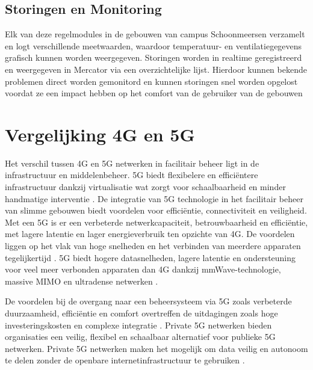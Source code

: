 \subsection{Storingen en Monitoring}
Elk van deze regelmodules in de gebouwen van campus Schoonmeersen verzamelt en logt verschillende meetwaarden, waardoor temperatuur- en ventilatiegegevens grafisch kunnen worden weergegeven.\newline\newline
Storingen worden in realtime geregistreerd en weergegeven in Mercator via een overzichtelijke lijst. Hierdoor kunnen bekende problemen direct worden gemonitord en kunnen storingen snel worden opgelost voordat ze een impact hebben op het comfort van de gebruiker van de gebouwen


\section{Vergelijking 4G en 5G}
Het verschil tussen 4G en 5G netwerken in facilitair beheer ligt in de infrastructuur en middelenbeheer. 5G biedt flexibelere en efficiëntere infrastructuur dankzij virtualisatie wat zorgt voor schaalbaarheid en minder handmatige interventie \autocite{degambur2021resource}. De integratie van 5G technologie in het facilitair beheer van slimme gebouwen biedt voordelen voor efficiëntie, connectiviteit en veiligheid. Met een 5G is er een verbeterde netwerkcapaciteit, betrouwbaarheid en efficiëntie, met lagere latentie en lager energieverbruik ten opzichte van 4G. De voordelen liggen op het vlak van hoge snelheden en het verbinden van meerdere apparaten tegelijkertijd \autocite{mihret20214g}. 5G biedt hogere datasnelheden, lagere latentie en ondersteuning voor veel meer verbonden apparaten dan 4G dankzij mmWave-technologie, massive MIMO en ultradense netwerken \autocite{Hui_2020}.

De voordelen bij de overgang naar een beheersysteem via 5G zoals verbeterde duurzaamheid, efficiëntie en comfort overtreffen de uitdagingen zoals hoge investeringskosten en complexe integratie \autocite{Markogiannaki2023}. Private 5G netwerken bieden organisaties een veilig, flexibel en schaalbaar alternatief voor publieke 5G netwerken. Private 5G netwerken maken het mogelijk om data veilig en autonoom te delen zonder de openbare internetinfrastructuur te gebruiken \autocite{eswaran2023private}.

